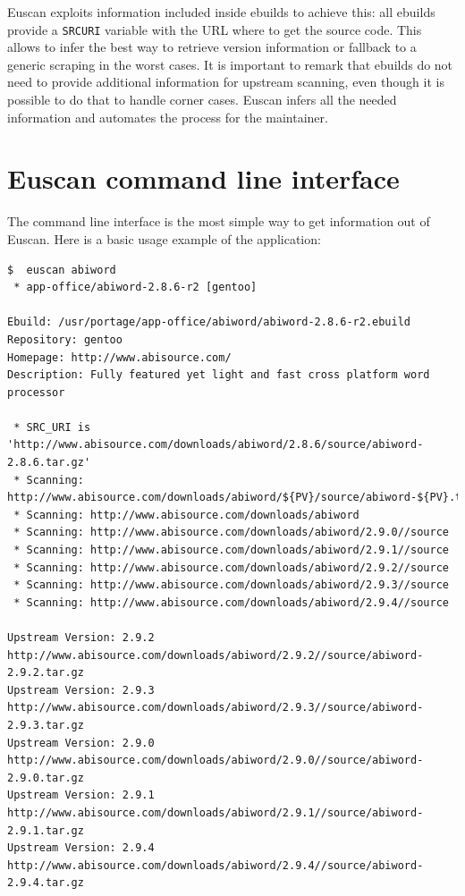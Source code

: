 Euscan exploits information included inside ebuilds to achieve this: all ebuilds provide a \texttt{SRC\textunderscore URI} variable with the URL where to get the source code. This allows to infer the best way to retrieve version information or fallback to a generic scraping in the worst cases.
It is important to remark that ebuilds do not need to provide additional information for upstream scanning, even though it is possible to do that to handle corner cases. Euscan infers all the needed information and automates the process for the maintainer.


\section{Euscan command line interface}
The command line interface is the most simple way to get information out of Euscan. Here is a basic usage example of the application:

\vspace{0.5cm}
\lstset{caption=Example of Euscan usage, label=Euscan example, numbers=none, frame=none, breaklines=true}
\begin{lstlisting}
$  euscan abiword
 * app-office/abiword-2.8.6-r2 [gentoo]

Ebuild: /usr/portage/app-office/abiword/abiword-2.8.6-r2.ebuild
Repository: gentoo
Homepage: http://www.abisource.com/
Description: Fully featured yet light and fast cross platform word processor

 * SRC_URI is 'http://www.abisource.com/downloads/abiword/2.8.6/source/abiword-2.8.6.tar.gz'
 * Scanning: http://www.abisource.com/downloads/abiword/${PV}/source/abiword-${PV}.tar.gz
 * Scanning: http://www.abisource.com/downloads/abiword
 * Scanning: http://www.abisource.com/downloads/abiword/2.9.0//source
 * Scanning: http://www.abisource.com/downloads/abiword/2.9.1//source
 * Scanning: http://www.abisource.com/downloads/abiword/2.9.2//source
 * Scanning: http://www.abisource.com/downloads/abiword/2.9.3//source
 * Scanning: http://www.abisource.com/downloads/abiword/2.9.4//source

Upstream Version: 2.9.2  http://www.abisource.com/downloads/abiword/2.9.2//source/abiword-2.9.2.tar.gz
Upstream Version: 2.9.3  http://www.abisource.com/downloads/abiword/2.9.3//source/abiword-2.9.3.tar.gz
Upstream Version: 2.9.0  http://www.abisource.com/downloads/abiword/2.9.0//source/abiword-2.9.0.tar.gz
Upstream Version: 2.9.1  http://www.abisource.com/downloads/abiword/2.9.1//source/abiword-2.9.1.tar.gz
Upstream Version: 2.9.4  http://www.abisource.com/downloads/abiword/2.9.4//source/abiword-2.9.4.tar.gz
\end{lstlisting}
\vspace{0.5cm}

